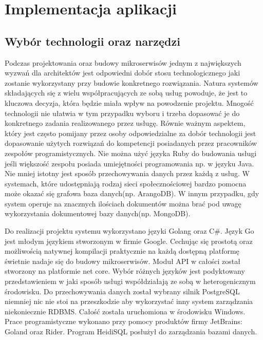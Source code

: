 \chapter{Implementacja aplikacji}
\section{Wybór technologii oraz narzędzi}
\par Podczas projektowania oraz budowy mikroserwisów jednym z największych wyzwań dla architektów jest odpowiedni dobór stosu technologicznego jaki zostanie wykorzystany przy budowie konkretnego rozwiązania. Natura systemów składających się z wielu współpracujących ze sobą usług powoduje, że jest to kluczowa decyzja, która będzie miała wpływ na powodzenie projektu. Mnogość technologii nie ułatwia w tym przypadku wyboru i trzeba dopasować je do konkretnego zadania realizowanego przez usługę. Równie ważnym aspektem, który jest często pomijany przez osoby odpowiedzialne za dobór technologii jest dopasowanie użytych rozwiązań do kompetencji posiadanych przez pracowników zespołów programistycznych. Nie można użyć języka Ruby do budowania usługi jeśli większość zespołu posiada umiejętności programowania np. w języku Java. Nie mniej istotny jest sposób przechowywania danych przez każdą z usług. W systemach, które udostępniają rodzaj sieci społecznościowej bardzo pomocna może okazać się grafowa baza danych(np. ArangoDB). W innym przypadku, gdy system operuje na znacznych ilościach dokumentów można brać pod uwagę wykorzystania dokumentowej bazy danych(np. MongoDB).
\par Do realizacji projektu systemu wykorzystano języki Golang oraz C\#. Język Go jest młodym językiem stworzonym w firmie Google. Cechując się prostotą oraz możliwością natywnej kompilacji praktycznie na każdą dostępną platformę świetnie nadaje się do budowy mikroserwisów. Moduł API w całości został stworzony na platformie net core. Wybór różnych języków jest podyktowany przedstawieniem w jaki sposób usługi współdziałają ze sobą w heterogenicznym środowisku. Do przechowywania danych został wybrany silnik PostgreSQL niemniej nic nie stoi na przeszkodzie aby wykorzystać inny system zarządzania niekoniecznie RDBMS. Całość została uruchomiona w środowisku Windows. Prace programistyczne wykonano przy pomocy produktów firmy JetBrains: Goland oraz Rider. Program HeidiSQL posłużył do zarządzania bazami danych.
